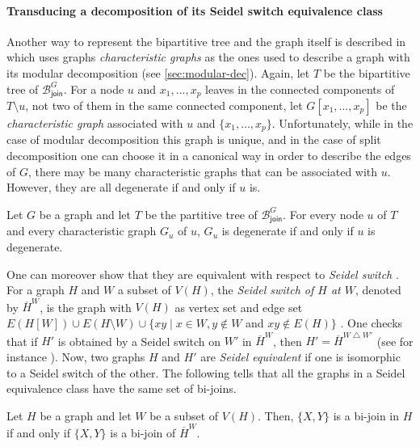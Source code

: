 \documentclass{lmcs} %
\DeclareMathOperator*\symdiff{\bigtriangleup}
\newcommand{\joinSet}{\ensuremath{\mathcal{B}_\mathsf{join}^G}}
\begin{document}
\paragraph*{Transducing a decomposition of its Seidel switch equivalence class \cite{raoThesis}}

Another way to represent the bipartitive tree and the graph itself is described in \cite{MontgolfierR05,raoThesis} which uses graphs \emph{characteristic
  graphs} as the ones used to describe a graph with its modular decomposition (see \autoref{sec:modular-dec}). Again, let $T$ be the bipartitive tree of
$\joinSet$. For a node $u$ and $x_1,\ldots, x_p$ leaves in the connected components of $T\setminus u$, not two of them in the same connected component, let
$G[x_1,\ldots, x_p]$ be the \emph{characteristic graph} associated with $u$ and $\{x_1,\ldots, x_p\}$. Unfortunately, while in the case of modular decomposition this graph is
unique, and in the case of split decomposition one can choose it in a canonical way in order to describe the edges of $G$, there may be many characteristic
graphs that can be associated with $u$. However, they are all degenerate if and only if $u$ is.

\begin{lemC}\label{lem:property-characteristic-graph} Let $G$ be a graph and let $T$ be the partitive tree of
  $\joinSet$. For every node $u$ of $T$ and every characteristic graph $G_u$ of $u$, $G_u$ is degenerate if and only if $u$ is degenerate.
\end{lemC}

One can moreover show that they are equivalent with respect to \emph{Seidel switch} \cite{raoThesis}. For a graph $H$ and $W$ a subset of $V(H)$, the
\emph{Seidel switch of $H$ at $W$}, denoted by $\overline{H}^W$, is the graph with $V(H)$ as vertex set and edge set
$E(H[W])\cup E(H\setminus W) \cup \{xy\mid x\in W, y\notin W$ and $xy\notin E(H)\}$ \cite{seidel1991}. One checks that if $H'$ is obtained by a Seidel switch on
$W'$ in $\overline{H}^W$, then $H'=\overline{H}^{W\symdiff W'}$ (see for instance \cite[Lemma 11.1]{ehrenfeuchtHR1999}). Now, two graphs $H$ and $H'$ are \emph{Seidel equivalent} if one is isomorphic to a Seidel switch
of the other. The following tells that all the graphs in a Seidel equivalence class have the same set of bi-joins.

\begin{lemC} Let $H$ be a graph and let $W$ be a subset of $V(H)$. Then, $\{X,Y\}$ is a bi-join in $H$ if and only if $\{X,Y\}$ is a
  bi-join of $\overline{H}^W$.
\end{lemC}
\end{document}
